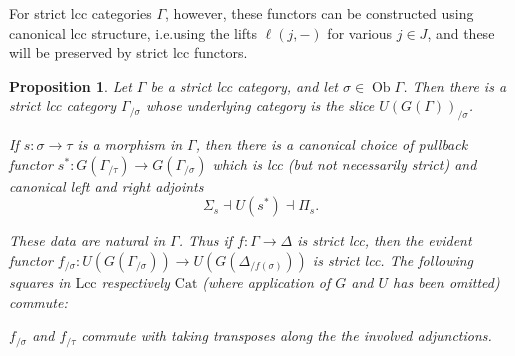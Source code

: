 \documentclass[a4paper]{article}
\newtheorem{proposition}[theorem]{Proposition}
\theoremstyle{remark}
\theoremstyle{definition}
\begin{document}
For strict lcc categories $\Gamma$, however, these functors can be constructed using canonical lcc structure, i.e.\@ using the lifts $\ell(j, -)$ for various $j \in J$, and these will be preserved by strict lcc functors.
\begin{proposition}
  \label{prop:strict-slicing}
  Let $\Gamma$ be a strict lcc category, and let $\sigma \in \operatorname{Ob} \Gamma$.
  Then there is a strict lcc category $\Gamma_{/ \sigma}$ whose underlying category is the slice $U(G(\Gamma))_{/ \sigma}$.

  If $s : \sigma \rightarrow \tau$ is a morphism in $\Gamma$, then there is a canonical choice of pullback functor $s^* : G(\Gamma_{/ \tau}) \rightarrow G(\Gamma_{/ \sigma})$ which is lcc (but not necessarily strict) and canonical left and right adjoints
  \begin{equation}
    \Sigma_s \dashv U(s^*) \dashv \Pi_s.
  \end{equation}

  These data are natural in $\Gamma$.
  Thus if $f : \Gamma \rightarrow \Delta$ is strict lcc, then the evident functor $f_{/ \sigma} : U(G(\Gamma_{/ \sigma})) \rightarrow U(G(\Delta_{ / f(\sigma)}))$ is strict lcc.
  The following squares in $\mathrm{Lcc}$ respectively $\mathrm{Cat}$ (where application of $G$ and $U$ has been omitted) commute:
  $f_{/ \sigma}$ and $f_{/ \tau}$ commute with taking transposes along the the involved adjunctions.
\end{proposition}
\end{document}

